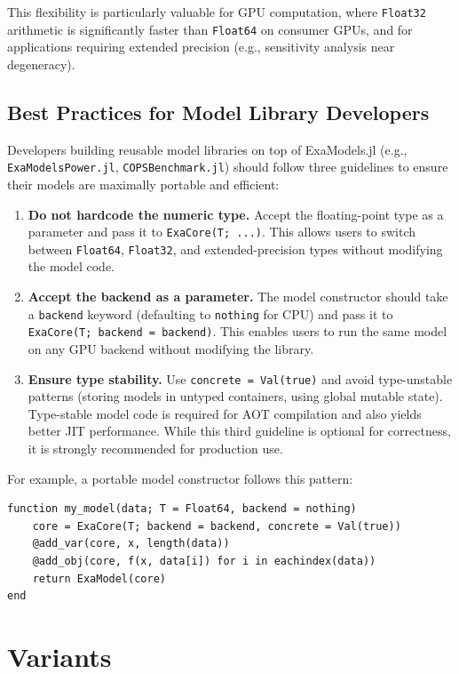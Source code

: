 \documentclass[11pt]{article}
\begin{document}
This flexibility is particularly valuable for GPU computation, where \texttt{Float32} arithmetic is significantly faster than \texttt{Float64} on consumer GPUs, and for applications requiring extended precision (e.g., sensitivity analysis near degeneracy).

\subsection{Best Practices for Model Library Developers}
\label{sec:aot:bestpractices}

Developers building reusable model libraries on top of ExaModels.jl (e.g., \texttt{ExaModelsPower.jl}, \texttt{COPSBenchmark.jl}) should follow three guidelines to ensure their models are maximally portable and efficient:
\begin{enumerate}
  \item \textbf{Do not hardcode the numeric type.} Accept the floating-point type as a parameter and pass it to \texttt{ExaCore(T; ...)}. This allows users to switch between \texttt{Float64}, \texttt{Float32}, and extended-precision types without modifying the model code.
  \item \textbf{Accept the backend as a parameter.} The model constructor should take a \texttt{backend} keyword (defaulting to \texttt{nothing} for CPU) and pass it to \texttt{ExaCore(T; backend = backend)}. This enables users to run the same model on any GPU backend without modifying the library.
  \item \textbf{Ensure type stability.} Use \texttt{concrete = Val(true)} and avoid type-unstable patterns (storing models in untyped containers, using global mutable state). Type-stable model code is required for AOT compilation and also yields better JIT performance. While this third guideline is optional for correctness, it is strongly recommended for production use.
\end{enumerate}
For example, a portable model constructor follows this pattern:
\begin{lstlisting}
function my_model(data; T = Float64, backend = nothing)
    core = ExaCore(T; backend = backend, concrete = Val(true))
    @add_var(core, x, length(data))
    @add_obj(core, f(x, data[i]) for i in eachindex(data))
    return ExaModel(core)
end
\end{lstlisting}

\section{Variants}
\label{sec:extensions}
\end{document}
